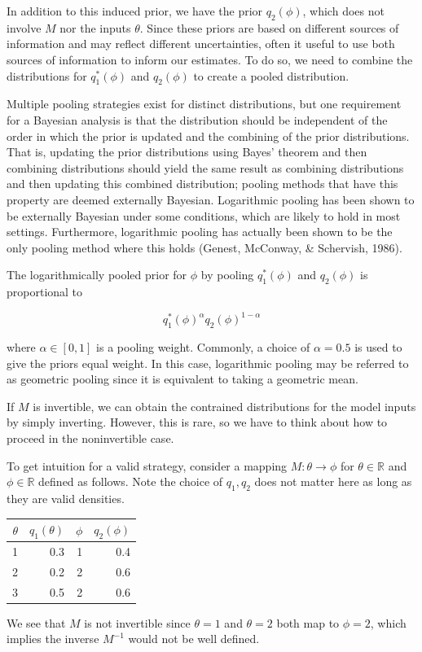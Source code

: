 \documentclass[12pt,twoside]{smiththesis}
\begin{document}
In addition to this induced prior, we have the prior \(q_2(\phi)\), which does not involve \(M\) nor the inputs \(\theta\). Since these priors are based on different sources of information and may reflect different uncertainties, often it useful to use both sources of information to inform our estimates. To do so, we need to combine the distributions for \(q^*_1(\phi)\) and \(q_2(\phi)\) to create a pooled distribution.

Multiple pooling strategies exist for distinct distributions, but one requirement for a Bayesian analysis is that the distribution should be independent of the order in which the prior is updated and the combining of the prior distributions. That is, updating the prior distributions using Bayes' theorem and then combining distributions should yield the same result as combining distributions and then updating this combined distribution; pooling methods that have this property are deemed externally Bayesian. Logarithmic pooling has been shown to be externally Bayesian under some conditions, which are likely to hold in most settings. Furthermore, logarithmic pooling has actually been shown to be the only pooling method where this holds (Genest, McConway, \& Schervish, 1986).

The logarithmically pooled prior for \(\phi\) by pooling \(q^*_1(\phi)\) and \(q_2(\phi)\) is proportional to

\[q^*_1(\phi)^{\alpha} q_2(\phi)^{1-\alpha}\]

where \(\alpha \in [0,1]\) is a pooling weight. Commonly, a choice of \(\alpha = 0.5\) is used to give the priors equal weight. In this case, logarithmic pooling may be referred to as geometric pooling since it is equivalent to taking a geometric mean.

If \(M\) is invertible, we can obtain the contrained distributions for the model inputs by simply inverting. However, this is rare, so we have to think about how to proceed in the noninvertible case.

To get intuition for a valid strategy, consider a mapping \(M: \theta \to \phi\) for \(\theta \in \mathbb{R}\) and \(\phi \in \mathbb{R}\)
defined as follows. Note the choice of \(q_1,q_2\) does not matter here as long as they are valid densities.
\begin{table}[H]
\centering
\begin{tabular}[t]{r|r|r|r}
\hline
$\theta$ & $q_1(\theta)$ & $\phi$ & $q_2(\phi)$\\
\hline
1 & 0.3 & 1 & 0.4\\
\hline
2 & 0.2 & 2 & 0.6\\
\hline
3 & 0.5 & 2 & 0.6\\
\hline
\end{tabular}
\end{table}
We see that \(M\) is not invertible since \(\theta=1\) and \(\theta = 2\) both map to \(\phi=2\), which implies the inverse \(M^{-1}\) would not be well defined.
\end{document}
